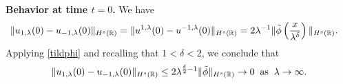 %
\textbf{Behavior at time $t=0$.}  We have
%
%
%
%
\begin{equation*}
\begin{split}
\|u_{1,\lambda}(0) - u_{-1,\lambda}(0) \|_{H^s(\mathbb{R})} & = \|u^{1,\lambda}(0) 
- u^{-1,\lambda}(0) \|_{H^s(\mathbb{R})}
= 2 \lambda^{-1} \| \tilde{\phi}\left( \frac{x}{\lambda^\delta}
\right) \|_{H^s(\mathbb{R})}.
\label{apple}
\end{split}
\end{equation*}
%
%
%
%
Applying \eqref{tildphi} and recalling that $1<\delta<2$, we conclude that
%
%
\begin{equation}
\begin{split}
	\|u_{1,\lambda}(0) - u_{-1,\lambda}(0) \|_{H^s(\mathbb{R})} \le 2
\lambda^{\frac{\delta}{2}-1} \|\tilde{\phi} \|_{H^s(\mathbb{R})} \to 0
\; \; \text{as} \; \; \lambda \to \infty.
\label{apple70}
\end{split}
\end{equation}
%
%
%
%
%  
%


